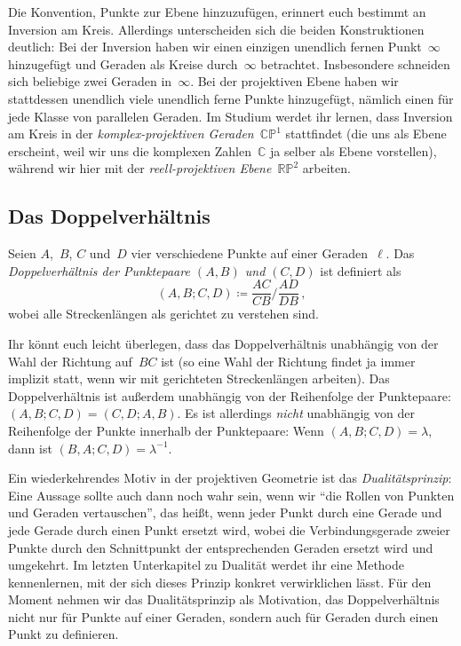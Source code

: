 Die Konvention, Punkte zur Ebene hinzuzufügen, erinnert euch bestimmt an Inversion am Kreis. Allerdings unterscheiden sich die beiden Konstruktionen deutlich: Bei der Inversion haben wir einen einzigen unendlich fernen Punkt~$\infty$ hinzugefügt und Geraden als Kreise durch~$\infty$ betrachtet. Insbesondere schneiden sich beliebige zwei Geraden in~$\infty$. Bei der projektiven Ebene haben wir stattdessen unendlich viele unendlich ferne Punkte hinzugefügt, nämlich einen für jede Klasse von parallelen Geraden. Im Studium werdet ihr lernen, dass Inversion am Kreis in der \emph{komplex-projektiven Geraden~$\mathbb{CP}^1$} stattfindet (die uns als Ebene erscheint, weil wir uns die komplexen Zahlen~$\mathbb C$ ja selber als Ebene vorstellen), während wir hier mit der \emph{reell-projektiven Ebene~$\mathbb{RP}^2$} arbeiten.

\subsection*{Das Doppelverhältnis}
\begin{definition}
	Seien $A$,~$B$, $C$ und~$D$ vier verschiedene Punkte auf einer Geraden~$\ell$. Das \emph{Doppelverhältnis der Punktepaare $(A,B)$ und $(C,D)$} ist definiert als
	\begin{equation*}
		(A,B;C,D)\coloneqq \frac{AC}{CB}\bigg/\!\frac{AD}{DB}\,,
	\end{equation*}
	wobei alle Streckenlängen als gerichtet zu verstehen sind.
\end{definition}

Ihr könnt euch leicht überlegen, dass das Doppelverhältnis unabhängig von der Wahl der Richtung auf~$BC$ ist (so eine Wahl der Richtung findet ja immer implizit statt, wenn wir mit gerichteten Streckenlängen arbeiten). Das Doppelverhältnis ist außerdem unabhängig von der Reihenfolge der Punktepaare: $(A,B;C,D)=(C,D;A,B)$. Es ist allerdings \emph{nicht} unabhängig von der Reihenfolge der Punkte innerhalb der Punktepaare: Wenn $(A,B;C,D)=\lambda$, dann ist $(B,A;C,D)=\lambda^{-1}$.

Ein wiederkehrendes Motiv in der projektiven Geometrie ist das \emph{Dualitätsprinzip}: Eine Aussage sollte auch dann noch wahr sein, wenn wir \enquote{die Rollen von Punkten und Geraden vertauschen}, das heißt, wenn jeder Punkt durch eine Gerade und jede Gerade durch einen Punkt ersetzt wird, wobei die Verbindungsgerade zweier Punkte durch den Schnittpunkt der entsprechenden Geraden ersetzt wird und umgekehrt. Im letzten Unterkapitel zu Dualität werdet ihr eine Methode kennenlernen, mit der sich dieses Prinzip konkret verwirklichen lässt. Für den Moment nehmen wir das Dualitätsprinzip als Motivation, das Doppelverhältnis nicht nur für Punkte auf einer Geraden, sondern auch für Geraden durch einen Punkt zu definieren. 

